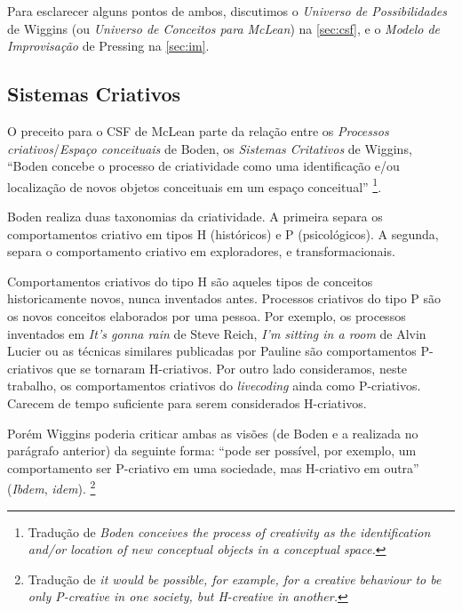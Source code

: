 Para esclarecer alguns pontos de ambos, discutimos o \emph{Universo de Possibilidades} de Wiggins (ou \emph{Universo de Conceitos para McLean}) na \autoref{sec:csf}, e  o \emph{Modelo de Improvisação} de Pressing na \autoref{sec:im}.

\subsection{Sistemas Criativos}\label{sec:sistemas_criativos}

O preceito para o CSF de McLean parte da relação entre os \emph{Processos criativos}/\emph{Espaço conceituais} de Boden, os \emph{Sistemas Critativos} de Wiggins, ``Boden concebe o processo de criatividade como uma identificação e/ou localização de novos objetos conceituais em um espaço conceitual'' \cite[p.~450]{wiggins_framework_2006}\footnote{Tradução de \emph{Boden conceives the process of creativity as the identification and/or location of new conceptual objects in a conceptual space.}}.

Boden realiza duas taxonomias da criatividade. A primeira separa os comportamentos criativo em tipos H (históricos) e P (psicológicos). A segunda, separa o comportamento criativo em exploradores, e transformacionais. 

Comportamentos criativos do tipo H são aqueles tipos de conceitos historicamente novos, nunca inventados antes. Processos criativos do tipo P são os novos conceitos elaborados por uma pessoa. Por exemplo, os processos inventados em \emph{It's gonna rain} de Steve Reich, \emph{I'm sitting in a room} de Alvin Lucier ou as técnicas similares publicadas por Pauline  são comportamentos P-criativos que se tornaram H-criativos. Por outro lado consideramos, neste trabalho, os comportamentos criativos do \emph{livecoding} ainda como P-criativos. Carecem de tempo suficiente para serem considerados H-criativos.

Porém Wiggins poderia criticar ambas as visões (de Boden e a realizada no parágrafo anterior) da seguinte forma: ``pode ser possível, por exemplo, um comportamento ser P-criativo em uma sociedade, mas H-criativo em outra'' (\emph{Ibdem}, \emph{idem}). \footnote{Tradução de \emph{it would be possible, for example, for a creative behaviour to be only P-creative in one society, but H-creative in another.}}

